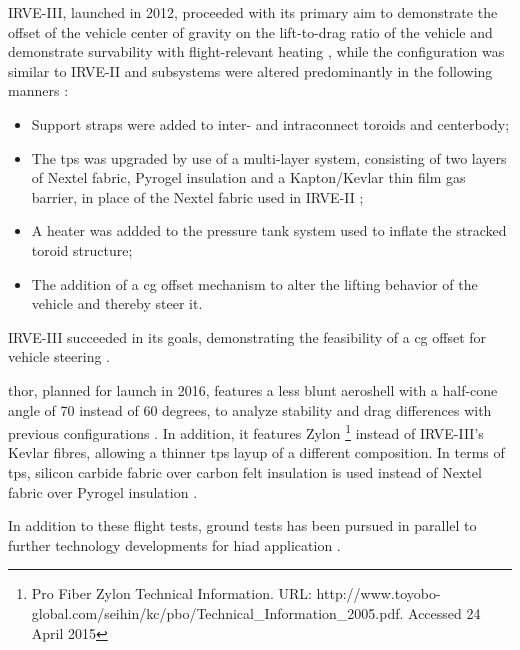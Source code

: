 IRVE-III, launched in 2012, proceeded with its primary aim to demonstrate the offset of the vehicle center of gravity on the lift-to-drag ratio of the vehicle and demonstrate survability with flight-relevant heating \cite{ACSperformanceirve3}, while the configuration was similar to IRVE-II and subsystems were altered predominantly in the following  manners \cite{ACSperformanceirve3}:
\begin{itemize}
\item Support straps were added to inter- and intraconnect toroids and centerbody;
\item The \gls{tps} was upgraded by use of a multi-layer system, consisting of two layers of Nextel fabric, Pyrogel insulation and a Kapton/Kevlar thin film gas barrier, in place of the Nextel fabric used in IRVE-II \cite{flightperfirve3}; 
\item A heater was addded to the pressure tank system used to inflate the stracked toroid structure;
\item The addition of a \gls{cg} offset mechanism to alter the lifting behavior of the vehicle and thereby steer it.
\end{itemize}
IRVE-III succeeded in its goals, demonstrating the feasibility of a \gls{cg} offset for vehicle steering \cite{flightperfirve3}.

\gls{thor}, planned for launch in 2016, features a less blunt aeroshell with a half-cone angle of 70 instead of 60 degrees, to analyze stability and drag differences with previous \cite{Hughes2005, irve2, irve3} configurations \cite{thorplannedflight}. In addition, it features Zylon \footnote{Pro Fiber Zylon Technical Information. URL: http://www.toyobo-global.com/seihin/kc/pbo/Technical\_Information\_2005.pdf. Accessed 24 April 2015} instead of IRVE-III's Kevlar fibres, allowing a thinner \gls{tps} layup of a different composition. In terms of \gls{tps}, silicon carbide fabric over carbon felt insulation is used instead of Nextel fabric over Pyrogel insulation \cite{thorplannedflight}.

In addition to these flight tests, ground tests has been pursued in parallel to further technology developments for \gls{hiad} application \cite{hiadtechoverview}.


